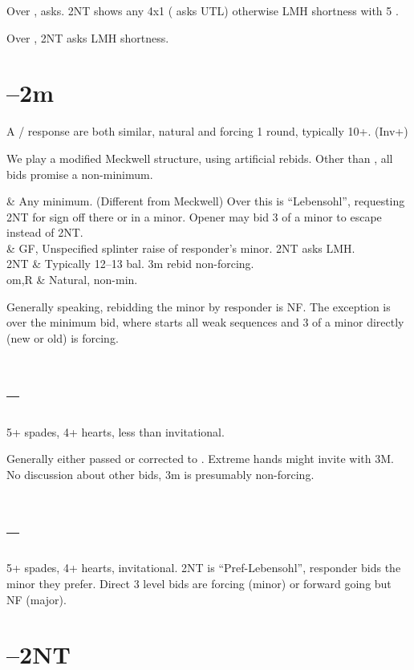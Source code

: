 \documentclass[tom-ari]{subfiles}
\begin{document}
Over ,  asks. 2NT shows any 4x1 ( asks UTL) otherwise LMH shortness with 5 \ccc.

Over , 2NT asks LMH shortness.

\section[1D--2m]{--2m}

A / response are both similar, natural and forcing 1 round, typically 10+. (Inv+)

We play a modified Meckwell structure, using artificial rebids. Other than , all bids promise a non-minimum.

\begin{bidtable}{}
	 & Any minimum. (Different from Meckwell) Over this  is ``Lebensohl'', requesting 2NT for sign off there or in a minor. Opener may bid 3 of a minor to escape instead of 2NT. \\
	 & GF, Unspecified splinter raise of responder's minor. 2NT asks LMH. \\
	2NT & Typically 12--13 bal. 3m rebid non-forcing. \\
	om,R &  Natural, non-min. \\
\end{bidtable}

Generally speaking, rebidding the minor by responder is NF. The exception is over the  minimum bid, where  starts all weak sequences and 3 of a minor directly (new or old) is forcing.

\section[1D--2H]{--}

5+ spades, 4+ hearts, less than invitational. 

Generally either passed or corrected to . Extreme hands might invite with 3M. No discussion about other bids, 3m is presumably non-forcing.

\section[1D--2S]{--}

5+ spades, 4+ hearts, invitational.  2NT is ``Pref-Lebensohl'', responder bids the minor they prefer. Direct 3 level bids are forcing (minor) or forward going but NF (major).

\section[1D--2NT]{--2NT}
\end{document}
